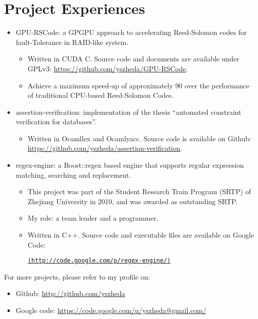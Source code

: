\documentclass[letterpaper]{article}
\begin{document}
\section*{Project Experiences}
\begin{itemize}
  \item GPU-RSCode: a GPGPU approach to accelerating Reed-Solomon codes for fault-Tolerance in RAID-like system.
	\begin{itemize}
	  \item Written in CUDA C. Source code and documents are available under GPLv3: \url{https://github.com/yszheda/GPU-RSCode}.
	  \item Achieve a maximum speed-up of approximately 90 over the performance of traditional CPU-based Reed-Solomon Codes.
	\end{itemize}
  \item assertion-verification: implementation of the thesis ``automated constraint verification for databases''.
	\begin{itemize}
	  \item Written in Ocamllex and Ocamlyacc. Source code is available on Github: \\ \url{https://github.com/yszheda/assertion-verification}.
	\end{itemize}
  \item regex-engine: a Boost::regex based engine that supports regular expression matching, searching and replacement.
    \begin{itemize}
	  \item This project was part of the Student Research Train Program (SRTP) of Zhejiang University in 2010, and was awarded as outstanding SRTP.
	\item My role: a team leader and a programmer.
	\item Written in C++. Source code and executable files are available on Google Code:

	  \href{http://code.google.com/p/regex-engine/}{\tt (http://code.google.com/p/regex-engine/)}
	\end{itemize}

\end{itemize}

For more projects, please refer to my profile on:
\begin{itemize}
  \item Github: \url{http://github.com/yszheda} 
  \item Google code: \url{https://code.google.com/u/yszheda@gmail.com/}
\end{itemize}
\end{document}
